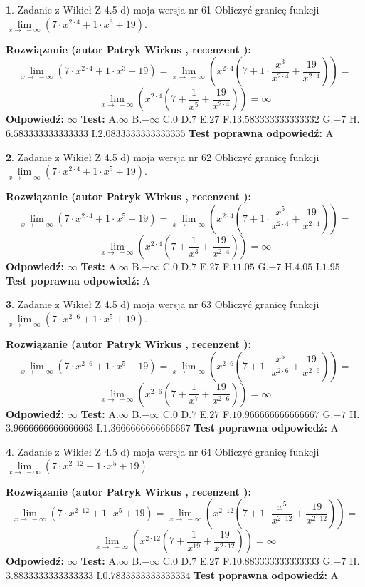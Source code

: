 \documentclass[12pt, a4paper]{article}
\theoremstyle{definition} %
\newtheorem{zad}{}
\newcommand{\zadStart}[1]{\begin{zad}#1\newline}
\newcommand{\zadStop}{\end{zad}}
\newcommand{\rozwStart}[2]{\noindent \textbf{Rozwiązanie (autor #1 , recenzent #2): }\newline}
\newcommand{\rozwStop}{\newline}
\newcommand{\odpStart}{\noindent \textbf{Odpowiedź:}\newline}
\newcommand{\odpStop}{\newline}
\newcommand{\testStart}{\noindent \textbf{Test:}\newline}
\newcommand{\testStop}{\newline}
\newcommand{\kluczStart}{\noindent \textbf{Test poprawna odpowiedź:}\newline}
\newcommand{\kluczStop}{\newline}
\begin{document}
\zadStart{Zadanie z Wikieł Z 4.5 d) moja wersja nr 61}
Obliczyć granicę funkcji  $\lim\limits_{x\to\ -\infty}(7 \cdot x^{2\cdot4}+1 \cdot x^{3}+19)$.
\zadStop
\rozwStart{Patryk Wirkus}{}
$$\lim\limits_{x\to\ -\infty}(7 \cdot x^{2\cdot4}+1 \cdot x^{3}+19) = \lim\limits_{x\to\ -\infty}(x^{2\cdot4}(7 +1 \cdot \frac{x^{3}}{x^{2\cdot4}}+\frac{19}{x^{2\cdot4}})) =$$ $$\lim\limits_{x\to\ -\infty}(x^{2\cdot4}(7 +\frac{1}{x^{5}}+\frac{19}{x^{2\cdot4}})) =\infty$$
\rozwStop
\odpStart
$\infty$
\odpStop
\testStart
A.$\infty$ B.$-\infty$ C.$0$ D.$7$ E.$27$
F.$13.583333333333332$ G.$-7$
H.$6.583333333333333$
I.$2.0833333333333335$
\testStop
\kluczStart
A
\kluczStop



\zadStart{Zadanie z Wikieł Z 4.5 d) moja wersja nr 62}
Obliczyć granicę funkcji  $\lim\limits_{x\to\ -\infty}(7 \cdot x^{2\cdot4}+1 \cdot x^{5}+19)$.
\zadStop
\rozwStart{Patryk Wirkus}{}
$$\lim\limits_{x\to\ -\infty}(7 \cdot x^{2\cdot4}+1 \cdot x^{5}+19) = \lim\limits_{x\to\ -\infty}(x^{2\cdot4}(7 +1 \cdot \frac{x^{5}}{x^{2\cdot4}}+\frac{19}{x^{2\cdot4}})) =$$ $$\lim\limits_{x\to\ -\infty}(x^{2\cdot4}(7 +\frac{1}{x^{3}}+\frac{19}{x^{2\cdot4}})) =\infty$$
\rozwStop
\odpStart
$\infty$
\odpStop
\testStart
A.$\infty$ B.$-\infty$ C.$0$ D.$7$ E.$27$
F.$11.05$ G.$-7$
H.$4.05$
I.$1.95$
\testStop
\kluczStart
A
\kluczStop



\zadStart{Zadanie z Wikieł Z 4.5 d) moja wersja nr 63}
Obliczyć granicę funkcji  $\lim\limits_{x\to\ -\infty}(7 \cdot x^{2\cdot6}+1 \cdot x^{5}+19)$.
\zadStop
\rozwStart{Patryk Wirkus}{}
$$\lim\limits_{x\to\ -\infty}(7 \cdot x^{2\cdot6}+1 \cdot x^{5}+19) = \lim\limits_{x\to\ -\infty}(x^{2\cdot6}(7 +1 \cdot \frac{x^{5}}{x^{2\cdot6}}+\frac{19}{x^{2\cdot6}})) =$$ $$\lim\limits_{x\to\ -\infty}(x^{2\cdot6}(7 +\frac{1}{x^{7}}+\frac{19}{x^{2\cdot6}})) =\infty$$
\rozwStop
\odpStart
$\infty$
\odpStop
\testStart
A.$\infty$ B.$-\infty$ C.$0$ D.$7$ E.$27$
F.$10.966666666666667$ G.$-7$
H.$3.9666666666666663$
I.$1.3666666666666667$
\testStop
\kluczStart
A
\kluczStop



\zadStart{Zadanie z Wikieł Z 4.5 d) moja wersja nr 64}
Obliczyć granicę funkcji  $\lim\limits_{x\to\ -\infty}(7 \cdot x^{2\cdot12}+1 \cdot x^{5}+19)$.
\zadStop
\rozwStart{Patryk Wirkus}{}
$$\lim\limits_{x\to\ -\infty}(7 \cdot x^{2\cdot12}+1 \cdot x^{5}+19) = \lim\limits_{x\to\ -\infty}(x^{2\cdot12}(7 +1 \cdot \frac{x^{5}}{x^{2\cdot12}}+\frac{19}{x^{2\cdot12}})) =$$ $$\lim\limits_{x\to\ -\infty}(x^{2\cdot12}(7 +\frac{1}{x^{19}}+\frac{19}{x^{2\cdot12}})) =\infty$$
\rozwStop
\odpStart
$\infty$
\odpStop
\testStart
A.$\infty$ B.$-\infty$ C.$0$ D.$7$ E.$27$
F.$10.883333333333333$ G.$-7$
H.$3.8833333333333333$
I.$0.7833333333333334$
\testStop
\kluczStart
A
\kluczStop
\end{document}
